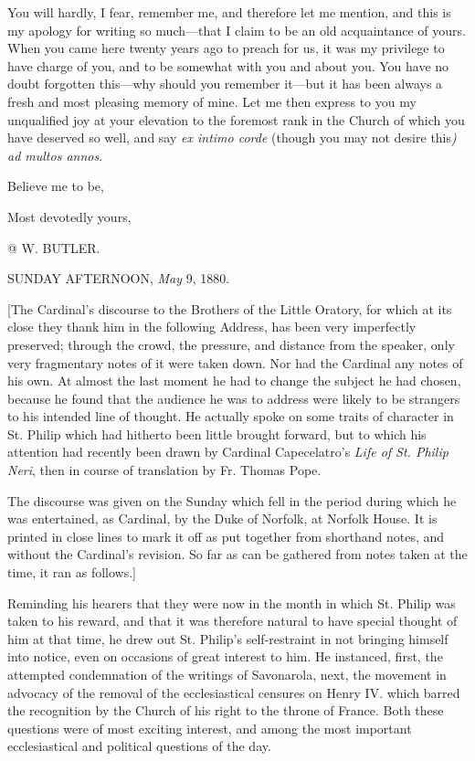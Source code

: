 You will hardly, I fear, remember me, and therefore let me
mention, and this is my apology for writing so much—that I claim to
be an old acquaintance of yours. When you came here twenty years ago
to preach for us, it was my privilege to have charge of you, and to be
somewhat with you and about you. You have no doubt forgotten this—why
should you remember it—but it has been always a fresh and most
pleasing memory of mine. Let me then express to you my unqualified joy
at your elevation to the foremost rank in the Church of which you have
deserved so well, and say \emph{ex intimo corde} (though you may not
desire this\emph{) ad multos annos}.

Believe me to be,

Most devotedly yours,

@ W. BUTLER.


SUNDAY AFTERNOON, \emph{May} 9, 1880.

[The Cardinal’s discourse to the Brothers of the Little Oratory,
for which at its close they thank him in the following Address, has
been very imperfectly preserved; through the crowd, the pressure, and
distance from the speaker, only very fragmentary notes of it were
taken down. Nor had the Cardinal any notes of his own. At almost the
last moment he had to change the subject he had chosen, because he
found that the audience he was to address were likely to be strangers
to his intended line of thought. He actually spoke on some traits of
character in St. Philip which had hitherto been little brought
forward, but to which his attention had recently been drawn by
Cardinal Capecelatro’s \emph{Life of St. Philip Neri}, then in
course of translation by Fr. Thomas Pope.

The discourse was given on the Sunday which fell in the period
during which he was entertained, as Cardinal, by the Duke of Norfolk,
at Norfolk House. It is printed in close lines to mark it off as put
together from shorthand notes, and without the Cardinal’s revision.
So far as can be gathered from notes taken at the time, it ran as
follows.]

Reminding his hearers that they were now in the month in which St.
Philip was taken to his reward, and that it was therefore natural to
have special thought of him at that time, he
drew out St. Philip’s self-restraint in not bringing himself into
notice, even on occasions of great interest to him. He instanced,
first, the attempted condemnation of the writings of Savonarola, next,
the movement in advocacy of the removal of the ecclesiastical censures
on Henry IV. which barred the recognition by the Church of his right
to the throne of France. Both these questions were of most exciting
interest, and among the most important ecclesiastical and political
questions of the day.

